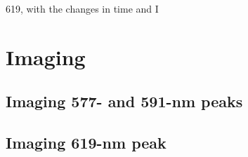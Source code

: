 619, with the changes in time and I

\section{Imaging}

\subsection{Imaging 577- and 591-nm peaks}

\subsection{Imaging 619-nm peak}